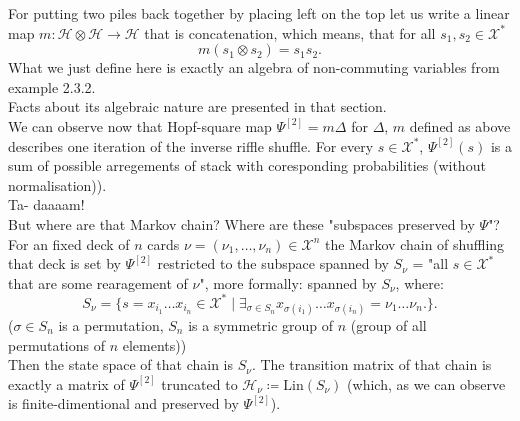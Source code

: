 \documentclass[a4paper, 12pt]{report}
\begin{document}
For putting two piles back together by placing left on the top let us write a linear map 
$m : \mathcal{H} \otimes \mathcal{H} \to \mathcal{H}$ that is concatenation, which means, that 
for all $s_1, s_2 \in \mathcal{X}^*$
\begin{equation*}
m(s_1 \otimes s_2) = s_1s_2.
\end{equation*}
What we just define here is exactly an algebra of non-commuting variables from example 
2.3.2.\\
Facts about its algebraic nature are presented in that section. \\
We can observe now that Hopf-square map $\Psi^{[2]} = m\Delta$ for $\Delta$, $m$ defined as above 
describes one iteration of the inverse riffle shuffle. For every $s \in \mathcal{X}^*$, $\Psi^{[2]}(s)$ is 
a sum of possible arregements of stack with coresponding probabilities (without normalisation)). 
\\ Ta- daaaam! \\[4pt]
But where are that Markov chain? Where are these "subspaces preserved by $\Psi$"? \\
For an fixed deck of $n$ cards $\nu = (\nu_1, \dots, \nu_n) \in \mathcal{X}^n$ the Markov chain of shuffling 
that deck is set by $\Psi^{[2]}$ restricted to the subspace spanned by $S_\nu$ = "all $s \in \mathcal{X}^*$ 
that are some rearagement of $\nu$", more formally: spanned by $S_\nu$, where:
\begin{equation*}
S_\nu = \{ s = x_{i_1}\dots x_{i_n} \in \mathcal{X}^* \mid
\exists_{\sigma \in S_n} x_{\sigma(i_1)}\dots x_{\sigma(i_n)} = \nu_1\dots \nu_n. \}.
\end{equation*}
($\sigma \in S_n$ is a permutation, $S_n$ is a symmetric group of $n$ (group of 
all permutations of $n$ elements))\\
Then the state space of that chain is $S_\nu$. The transition matrix of that chain is exactly a matrix of 
$\Psi^{[2]}$ truncated to $\mathcal{H}_\nu \coloneqq \mathrm{Lin}(S_\nu)$ 
(which, as we can observe is finite-dimentional and preserved by $\Psi^{[2]}$). \\[8pt]
\end{document}
